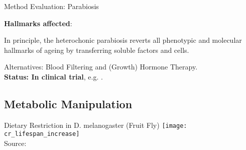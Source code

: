 \begin{frame}[c]{Method Evaluation: Parabiosis}
    \large



    \textbf{Hallmarks affected}:
    \begin{aquote}{\cite{conese2017fountain}}
        In principle, the heterochonic parabiosis reverts all phenotypic and molecular hallmarks of ageing by transferring soluble factors and cells.
    \end{aquote}

    \pause
    Alternatives: Blood Filtering and (Growth) Hormone Therapy. \\
    \pause
    \textbf{Status: In clinical trial}, e.g. \cite{AStudyto73:online}.
\end{frame}


\subsection{Metabolic Manipulation}

\begin{frame}[c]{Dietary Restriction in D. melanogaster (Fruit Fly)}
    \texttt{[image: cr\_lifespan\_increase]} \\
    Source: \cite{mair2005calories}
\end{frame}

